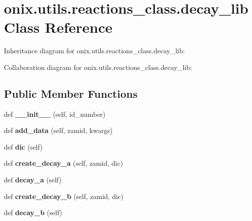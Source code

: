 \hypertarget{classonix_1_1utils_1_1reactions__class_1_1decay__lib}{}\section{onix.\+utils.\+reactions\+\_\+class.\+decay\+\_\+lib Class Reference}
\label{classonix_1_1utils_1_1reactions__class_1_1decay__lib}


Inheritance diagram for onix.\+utils.\+reactions\+\_\+class.\+decay\+\_\+lib\+:


Collaboration diagram for onix.\+utils.\+reactions\+\_\+class.\+decay\+\_\+lib\+:
\subsection*{Public Member Functions}
\begin{DoxyCompactItemize}
\item 
\mbox{\label{classonix_1_1utils_1_1reactions__class_1_1decay__lib_a4cba9441da3634d528bdc5db7e649dbe}} 
def {\bfseries \+\_\+\+\_\+init\+\_\+\+\_\+} (self, id\+\_\+number)
\item 
\mbox{\label{classonix_1_1utils_1_1reactions__class_1_1decay__lib_af016ec432b3b216491f4f9ce45fb8eb8}} 
def {\bfseries add\+\_\+data} (self, zamid, kwargs)
\item 
\mbox{\label{classonix_1_1utils_1_1reactions__class_1_1decay__lib_a76d223ce6d38104b65fc3fdee969ee16}} 
def {\bfseries dic} (self)
\item 
\mbox{\label{classonix_1_1utils_1_1reactions__class_1_1decay__lib_aa28ba0af91389054b80b707561810314}} 
def {\bfseries create\+\_\+decay\+\_\+a} (self, zamid, dic)
\item 
\mbox{\label{classonix_1_1utils_1_1reactions__class_1_1decay__lib_a0561432393d5b1f19642b96fa8c92c47}} 
def {\bfseries decay\+\_\+a} (self)
\item 
\mbox{\label{classonix_1_1utils_1_1reactions__class_1_1decay__lib_ad4a0b7645b7d612a7d13f8baa3bad404}} 
def {\bfseries create\+\_\+decay\+\_\+b} (self, zamid, dic)
\item 
\mbox{\label{classonix_1_1utils_1_1reactions__class_1_1decay__lib_af40b8e8728aaa4ef009774dbbad08d0c}} 
def {\bfseries decay\+\_\+b} (self)
\end{DoxyCompactItemize}


